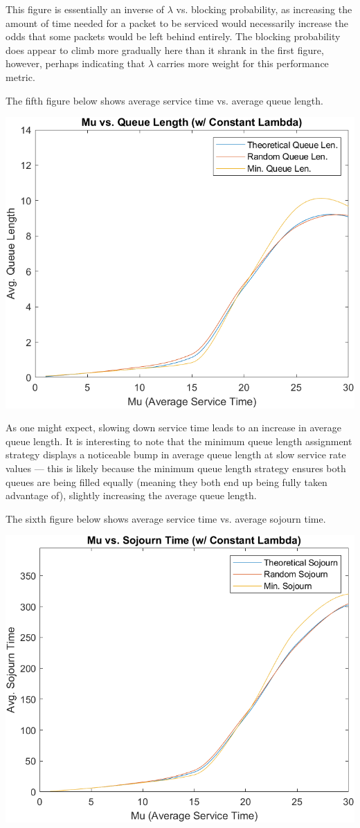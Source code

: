 \documentclass[11pt]{article} %
\begin{document}
This figure is essentially an inverse of $\lambda$ vs. blocking probability, as increasing the amount of time needed for a packet to be serviced would necessarily increase the odds that some packets would be left behind entirely. The blocking probability does appear to climb more gradually here than it shrank in the first figure, however, perhaps indicating that $\lambda$ carries more weight for this performance metric.

The fifth figure below shows average service time vs. average queue length.

\begin{center}
\includegraphics[width=.875\textwidth]{5}
\end{center}

As one might expect, slowing down service time leads to an increase in average queue length. It is interesting to note that the minimum queue length assignment strategy displays a noticeable bump in average queue length at slow service rate values — this is likely because the minimum queue length strategy ensures both queues are being filled equally (meaning they both end up being fully taken advantage of), slightly increasing the average queue length.

The sixth figure below shows average service time vs. average sojourn time.

\begin{center}
\includegraphics[width=.875\textwidth]{6}
\end{center}
\end{document}
